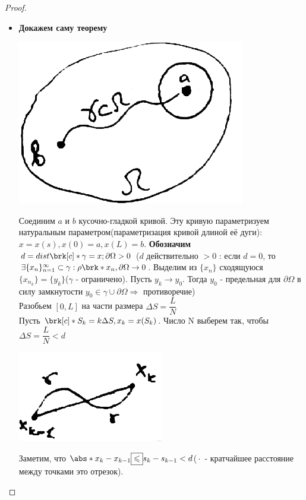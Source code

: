 \begin{theorem}
\begin{proof}
\begin{itemize}
\item
{\bf Докажем саму теорему}
\begin{center}
\includegraphics[scale=0.5]{19_1_new}
\end{center}
Соединим $a$ и $b$ кусочно-гладкой кривой. Эту кривую параметризуем натуральным параметром(параметризация кривой длиной её дуги): 
$x = x(s), x(0) = a, x(L) = b$.
{\bf Обозначим}
$d = dist\brk[c]*{\gamma = x; \partial{\Omega}} > 0$
($d$ действительно $> 0$ : если $d = 0$, то 
$\exists\{x_n\}_{n=1}^\infty \subset \gamma: \rho\brk*{x_n, \partial\Omega}\to 0$.
 Выделим из $\{x_n\}$ сходящуюся $\{x_{n_k}\}=\{y_k\}$($\gamma$ - ограничено). Пусть $y_k \to y_0$. Тогда $y_0$ - предельная для
 $\partial \Omega$ в силу замкнутости 
 $y_0 \in \gamma \cup \partial \Omega \Rightarrow$ противоречие)\\
 Разобьем $[0,L]$ на части размера $\Delta S = \dfrac{L}{N}$\\
 Пусть $\brk[c]*{S_k = k\Delta S, x_k = x(S_k)}$. 
 Число N выберем так, чтобы $\Delta S = \dfrac{L}{N} < d$\\
 \begin{center}
 \includegraphics[scale=0.5]{19_2_new}
 \end{center}
 Заметим, что $\abs*{x_k - x_{k-1}} \boxed{\leq} s_k - s_{k-1} < d$($\boxed{\cdot}$ - кратчайшее расстояние между точками это отрезок).
 \begin{center}

\end{center}
\end{itemize}
\end{proof}
\end{theorem}

